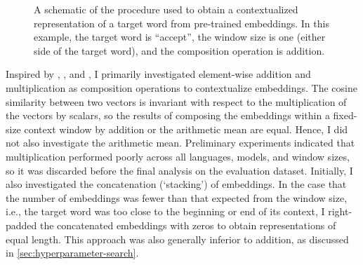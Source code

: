 \begin{figure}
  \centering
  \newcommand*{\orawidest}{accept}
  \newcommand*{\oratallest}{\#\#}
  \newlength{\orawidth}
  \settowidth{\orawidth}{\orawidest}
  \newcommand*{\ora}[1]{\overrightarrow{#1\vphantom{\oratallest}}}
  \caption{A schematic of the procedure used to
    obtain a contextualized representation of a target word from pre-trained embeddings.
    In this example, the target word is ``accept'', the window size is one (either side of
    the target word), and the composition operation is addition.
  }
  \label{chart:schematic-procedure}
\end{figure}

Inspired by \textcite{Landauer1997}, \textcite{Kintsch2001}, and
\textcite{Mitchell2008}, I primarily investigated element-wise addition and
multiplication as composition operations to contextualize embeddings.
The cosine similarity between two vectors is invariant with respect to the
multiplication of the vectors by scalars, so the results of composing the embeddings
within a fixed-size context window by addition or the arithmetic mean are equal.
Hence, I did not also investigate the arithmetic mean.
Preliminary experiments indicated that multiplication performed poorly across all
languages, models, and window sizes, so it was discarded before the final analysis on
the evaluation dataset.
Initially, I also investigated the concatenation (`stacking') of embeddings.
In the case that the number of embeddings was fewer than that expected from the window
size, i.e., the target word was too close to the beginning or end of its context, I
right-padded the concatenated embeddings with zeros to obtain representations of equal
length.
This approach was also generally inferior to addition, as discussed in
\cref{sec:hyperparameter-search}.

